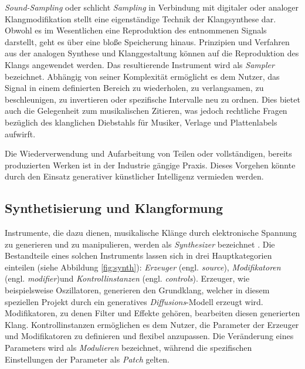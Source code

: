 \documentclass[
  a4paper,  %
  twoside,  %
  bibliography=totoc,
  headsepline,
  cleardoublepage=empty,
  parskip=half,
  draft=false
]{scrbook}
\begin{document}
\emph{Sound-Sampling} oder schlicht \emph{Sampling} in Verbindung mit digitaler oder analoger Klangmodifikation stellt eine eigenständige Technik der Klangsynthese dar. Obwohl es im Wesentlichen eine Reproduktion des entnommenen Signals darstellt, geht es über eine bloße Speicherung hinaus. Prinzipien und Verfahren aus der analogen Synthese und Klanggestaltung können auf die Reproduktion des Klangs angewendet werden. Das resultierende Instrument wird als \emph{Sampler} bezeichnet. Abhängig von seiner Komplexität ermöglicht es dem Nutzer, das Signal in einem definierten Bereich zu wiederholen, zu verlangsamen, zu beschleunigen, zu invertieren oder spezifische Intervalle neu zu ordnen. Dies bietet auch die Gelegenheit zum musikalischen Zitieren, was jedoch rechtliche Fragen bezüglich des klanglichen Diebstahls für Musiker, Verlage und Plattenlabels aufwirft. \cite{russ_sound_2009, ruschkowski_elektronische_2019, katz_capturing_2010}

Die Wiederverwendung und Aufarbeitung von Teilen oder vollständigen, bereits produzierten Werken ist in der Industrie gängige Praxis. Dieses Vorgehen könnte durch den Einsatz generativer künstlicher Intelligenz vermieden werden.

\subsection{Synthetisierung und Klangformung} \label{sec:synth+envelope}

Instrumente, die dazu dienen, musikalische Klänge durch elektronische Spannung zu generieren und zu manipulieren, werden als \emph{Synthesizer} bezeichnet \cite{dudenredaktion_synthesizer_nodate, pirkle_designing_2021}. Die Bestandteile eines solchen Instruments lassen sich in drei Hauptkategorien einteilen (siehe Abbildung \ref{fig:synth}): \emph{Erzeuger} (engl. \emph{source}), \emph{Modifikatoren} (engl. \emph{modifier})und \emph{Kontrollinstanzen} (engl. \emph{controls}). Erzeuger, wie beispielsweise Oszillatoren, generieren den Grundklang, welcher in diesem speziellen Projekt durch ein generatives \emph{Diffusions}-Modell erzeugt wird. Modifikatoren, zu denen Filter und Effekte gehören, bearbeiten diesen generierten Klang. Kontrollinstanzen ermöglichen es dem Nutzer, die Parameter der Erzeuger und Modifikatoren zu definieren und flexibel anzupassen. Die Veränderung eines Parameters wird als \emph{Modulieren} bezeichnet, während die spezifischen Einstellungen der Parameter als \emph{Patch} gelten. \cite{pirkle_designing_2021}   
\end{document}
